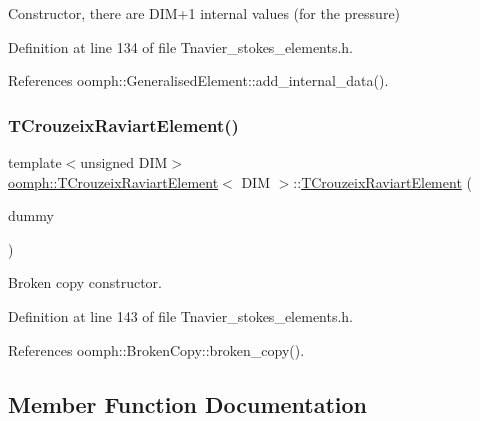 Constructor, there are D\+I\+M+1 internal values (for the pressure) 



Definition at line 134 of file Tnavier\+\_\+stokes\+\_\+elements.\+h.



References oomph\+::\+Generalised\+Element\+::add\+\_\+internal\+\_\+data().

\mbox{\label{classoomph_1_1TCrouzeixRaviartElement_a1db3af701d4fdb03a8ab059fb99e1117}} 
\subsubsection{\texorpdfstring{T\+Crouzeix\+Raviart\+Element()}{TCrouzeixRaviartElement()}\hspace{0.1cm}{\footnotesize\ttfamily [2/2]}}
{\footnotesize\ttfamily template$<$unsigned D\+IM$>$ \\
\hyperlink{classoomph_1_1TCrouzeixRaviartElement}{oomph\+::\+T\+Crouzeix\+Raviart\+Element}$<$ D\+IM $>$\+::\hyperlink{classoomph_1_1TCrouzeixRaviartElement}{T\+Crouzeix\+Raviart\+Element} (\begin{DoxyParamCaption}\item[{const \hyperlink{classoomph_1_1TCrouzeixRaviartElement}{T\+Crouzeix\+Raviart\+Element}$<$ D\+IM $>$ \&}]{dummy }\end{DoxyParamCaption})\hspace{0.3cm}{\ttfamily [inline]}}



Broken copy constructor. 



Definition at line 143 of file Tnavier\+\_\+stokes\+\_\+elements.\+h.



References oomph\+::\+Broken\+Copy\+::broken\+\_\+copy().



\subsection{Member Function Documentation}
\mbox{\label{classoomph_1_1TCrouzeixRaviartElement_ad99c365335e965607273f133d8739ae2}} 
